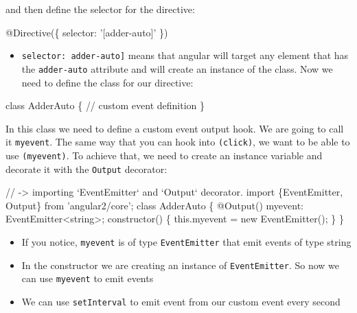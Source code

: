 \documentclass[12pt,]{article}
\newenvironment{Shaded}{}{}
\newcommand{\KeywordTok}[1]{\textcolor[rgb]{0.00,0.00,1.00}{{#1}}}
\newcommand{\CommentTok}[1]{\textcolor[rgb]{0.00,0.50,0.00}{{#1}}}
\newcommand{\FunctionTok}[1]{{#1}}
\newcommand{\NormalTok}[1]{{#1}}
\providecommand{\tightlist}{%
  \setlength{\itemsep}{0pt}\setlength{\parskip}{0pt}}
\begin{document}
and then define the selector for the directive:

\begin{Shaded}
\begin{Highlighting}[numbers=left,,]
\FunctionTok{@Directive}\NormalTok{(\{}
  \NormalTok{selector: '[adder-auto]'}
\NormalTok{\})}
\end{Highlighting}
\end{Shaded}

\begin{itemize}
\tightlist
\item
  \texttt{selector:\ \textquotesingle{}{[}adder-auto{]}\textquotesingle{}}
  means that angular will target any element that has the
  \texttt{adder-auto} attribute and will create an instance of the
  class. Now we need to define the class for our directive:
\end{itemize}

\begin{Shaded}
\begin{Highlighting}[numbers=left,,]
\KeywordTok{class} \NormalTok{AdderAuto \{}
  \CommentTok{// custom event definition}
\NormalTok{\}}
\end{Highlighting}
\end{Shaded}

In this class we need to define a custom event output hook. We are going
to call it \texttt{myevent}. The same way that you can hook into
\texttt{(click)}, we want to be able to use \texttt{(myevent)}. To
achieve that, we need to create an instance variable and decorate it
with the \texttt{Output} decorator:

\begin{Shaded}
\begin{Highlighting}[numbers=left,,]
\CommentTok{// -> importing `EventEmitter` and `Output` decorator.}
\KeywordTok{import \{EventEmitter, Output\} from 'angular2/core';}
\KeywordTok{class} \NormalTok{AdderAuto \{}
  \FunctionTok{@Output}\NormalTok{() myevent: EventEmitter<string>;}
  \FunctionTok{constructor}\NormalTok{() \{}
    \KeywordTok{this}\NormalTok{.}\FunctionTok{myevent} \NormalTok{= }\KeywordTok{new} \FunctionTok{EventEmitter}\NormalTok{();}
  \NormalTok{\}}
\NormalTok{\}}
\end{Highlighting}
\end{Shaded}

\begin{itemize}
\tightlist
\item
  If you notice, \texttt{myevent} is of type \texttt{EventEmitter} that
  emit events of type string
\item
  In the constructor we are creating an instance of
  \texttt{EventEmitter}. So now we can use \texttt{myevent} to emit
  events
\item
  We can use \texttt{setInterval} to emit event from our custom event
  every second
\end{itemize}
\end{document}
